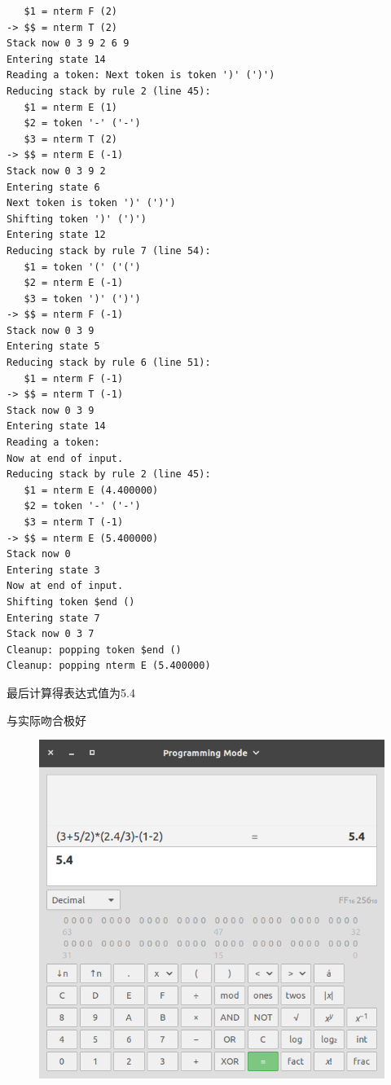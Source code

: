 \begin{verbatim}
   $1 = nterm F (2)
-> $$ = nterm T (2)
Stack now 0 3 9 2 6 9
Entering state 14
Reading a token: Next token is token ')' (')')
Reducing stack by rule 2 (line 45):
   $1 = nterm E (1)
   $2 = token '-' ('-')
   $3 = nterm T (2)
-> $$ = nterm E (-1)
Stack now 0 3 9 2
Entering state 6
Next token is token ')' (')')
Shifting token ')' (')')
Entering state 12
Reducing stack by rule 7 (line 54):
   $1 = token '(' ('(')
   $2 = nterm E (-1)
   $3 = token ')' (')')
-> $$ = nterm F (-1)
Stack now 0 3 9
Entering state 5
Reducing stack by rule 6 (line 51):
   $1 = nterm F (-1)
-> $$ = nterm T (-1)
Stack now 0 3 9
Entering state 14
Reading a token:
Now at end of input.
Reducing stack by rule 2 (line 45):
   $1 = nterm E (4.400000)
   $2 = token '-' ('-')
   $3 = nterm T (-1)
-> $$ = nterm E (5.400000)
Stack now 0
Entering state 3
Now at end of input.
Shifting token $end ()
Entering state 7
Stack now 0 3 7
Cleanup: popping token $end ()
Cleanup: popping nterm E (5.400000)
\end{verbatim}

最后计算得表达式值为5.4

与实际吻合极好

\begin{figure}[H]
  \centering
  \includegraphics[scale=0.8]{figures/calc.png}
\end{figure}
